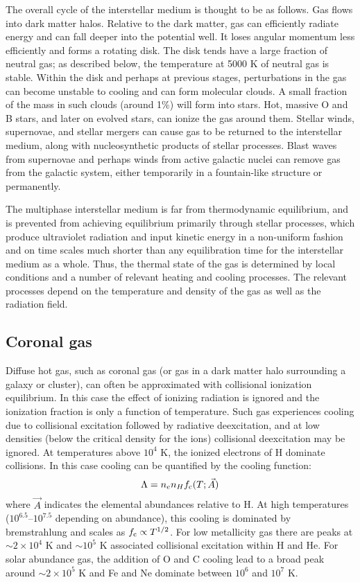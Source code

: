 The overall cycle of the interstellar medium is thought to be as
follows. Gas flows into dark matter halos. Relative to the dark
matter, gas can efficiently radiate energy and can fall deeper into
the potential well. It loses angular momentum less efficiently and
forms a rotating disk. The disk tends have a large fraction of neutral
gas; as described below, the temperature at 5000 K of neutral gas is
stable. Within the disk and perhaps at previous stages, perturbations
in the gas can become unstable to cooling and can form molecular
clouds. A small fraction of the mass in such clouds (around 1\%) will
form into stars. Hot, massive O and B stars, and later on evolved
stars, can ionize the gas around them. Stellar winds, supernovae, and
stellar mergers can cause gas to be returned to the interstellar
medium, along with nucleosynthetic products of stellar processes.
Blast waves from supernovae and perhaps winds from active galactic
nuclei can remove gas from the galactic system, either temporarily in
a fountain-like structure or permanently.

The multiphase interstellar medium is far from thermodynamic
equilibrium, and is prevented from achieving equilibrium primarily
through stellar processes, which produce ultraviolet radiation and
input kinetic energy in a non-uniform fashion and on time scales much
shorter than any equilibration time for the interstellar medium as a
whole. Thus, the thermal state of the gas is determined by local
conditions and a number of relevant heating and cooling processes. The
relevant processes depend on the temperature and density of the gas as
well as the radiation field.

\subsection{Coronal gas}

Diffuse hot gas, such as coronal gas (or gas in a dark matter halo
surrounding a galaxy or cluster), can often be approximated with
collisional ionization equilibrium. In this case the effect of
ionizing radiation is ignored and the ionization fraction is only a
function of temperature. Such gas experiences cooling due to
collisional excitation followed by radiative deexcitation, and at low
densities (below the critical density for the ions) collisional
deexcitation may be ignored. At temperatures above $10^4$ K, the
ionized electrons of H dominate collisions. In this case cooling can
be quantified by the cooling function:
\begin{equation}
\Lambda = n_e n_H f_{\rm c} (T; \vec{A})
\end{equation}
where $\vec{A}$ indicates the elemental abundances relative to H. At
high temperatures ($10^{6.5}$--$10^{7.5}$ depending on abundance),
this cooling is dominated by bremstrahlung and scales as $f_{\rm
c} \propto T^{1/2}$. For low metallicity gas there are peaks at $\sim
2\times 10^4$ K and $\sim 10^5$ K associated collisional excitation
within H and He. For solar abundance gas, the addition of O and C
cooling lead to a broad peak around $\sim 2 \times 10^5$ K and Fe and
Ne dominate between $10^6$ and $10^7$ K.

